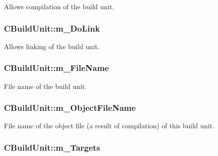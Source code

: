 Allows compilation of the build unit. 

\hypertarget{classCBuildUnit_a26d55f28bb6566143aaabb61c4fe93d4}{
\subsubsection[{m\-\_\-\-Do\-Link}]{\setlength{\rightskip}{0pt plus 5cm}C\-Build\-Unit\-::m\-\_\-\-Do\-Link\hspace{0.3cm}{\ttfamily [private]}}}\label{classCBuildUnit_a26d55f28bb6566143aaabb61c4fe93d4}


Allows linking of the build unit. 

\hypertarget{classCBuildUnit_a5ad43c7517f4f80499ff21daf294d967}{
\subsubsection[{m\-\_\-\-File\-Name}]{\setlength{\rightskip}{0pt plus 5cm}C\-Build\-Unit\-::m\-\_\-\-File\-Name\hspace{0.3cm}{\ttfamily [private]}}}\label{classCBuildUnit_a5ad43c7517f4f80499ff21daf294d967}


File name of the build unit. 

\hypertarget{classCBuildUnit_a890c7a9cef4689007e45631c01069fc5}{
\subsubsection[{m\-\_\-\-Object\-File\-Name}]{\setlength{\rightskip}{0pt plus 5cm}C\-Build\-Unit\-::m\-\_\-\-Object\-File\-Name\hspace{0.3cm}{\ttfamily [private]}}}\label{classCBuildUnit_a890c7a9cef4689007e45631c01069fc5}


File name of the object file (a result of compilation) of this build unit. 

\hypertarget{classCBuildUnit_a7de33cce470e64171c8bdbb502dd5395}{
\subsubsection[{m\-\_\-\-Targets}]{\setlength{\rightskip}{0pt plus 5cm}C\-Build\-Unit\-::m\-\_\-\-Targets\hspace{0.3cm}{\ttfamily [private]}}}\label{classCBuildUnit_a7de33cce470e64171c8bdbb502dd5395}


